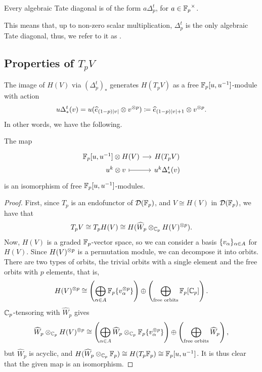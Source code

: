 \begin{corollary}
	Every algebraic Tate diagonal is of the form \(a\Delta^t_p\), for \(a \in {\mathbb{F}_p}^\times\).
\end{corollary}

This means that, up to non-zero scalar multiplication, \(\Delta^t_p\) is the only algebraic Tate diagonal, thus, we refer to it as .


\subsection{Properties of \(T_pV\)}

The image of \(H(V)\) via \((\Delta^t_p)_*\) generates \(H(T_pV)\) as a free \({\mathbb{F}_p}[u,u^{-1}]\)-module with action
\[
u \Delta^t_*(v) = u(\widehat e_{(1-p)|v|} \otimes v^{\otimes p}) \coloneqq \widehat e_{(1-p)|v|+1} \otimes v^{\otimes p}.
\]
In other words, we have the following.

\begin{lemma}\label{pTate_iso}
	The map
	\[
	\begin{tikzcd}[row sep=0, column sep=small]
		\Fp[u,u^{-1}] \ot H(V) \arrow[r] & H(T_pV) \\
		\hspace*{13pt} u^k \ot v \arrow[r, |->] & u^k \Delta^t_*(v)
	\end{tikzcd}
	\]
	is an isomorphism of free \({\mathbb{F}_p}[u,u^{-1}]\)-modules.
\end{lemma}

\begin{proof}
	First, since \(T_p\) is an endofunctor of \(\mathcal{D}({\mathbb{F}_p})\), and \(V \cong H(V)\) in \(\mathcal{D}({\mathbb{F}_p})\), we have that
	\[
	T_pV \cong T_pH(V) \cong H(\widehat W_p \otimes_{\cyc_p} H(V)^{\otimes p}). %
	\]
	Now, \(H(V)\) is a graded \({\mathbb{F}_p}\)-vector space, so we can consider a basis \(\{v_\alpha\}_{\alpha \in A}\) for \(H(V)\).
	Since \(H(V)^{\otimes p}\) is a permutation module, we can decompose it into orbits.
	There are two types of orbits, the trivial orbits with a single element and the free orbits with \(p\) elements, that is,
	\[
	H(V)^{\otimes p} \cong \left(\bigoplus_{\alpha \in A} {\mathbb{F}_p}\{v_\alpha^{\otimes p}\}\right) \oplus \left(\bigoplus_{\text{free orbits}} {\mathbb{F}_p}[\mathbb{C}_p]\right).
	\]
	\(\mathbb{C}_p\)-tensoring with \(\widehat W_p\) gives
	\[
	\widehat W_p \otimes_{\mathbb{C}_p} H(V)^{\otimes p} \cong \left(\bigoplus_{\alpha \in A} \widehat W_p \otimes_{\mathbb{C}_p} {\mathbb{F}_p}\{v_\alpha^{\otimes p}\}\right) \oplus \left(\bigoplus_{\text{free orbits}} \widehat W_p\right),
	\]
	but \(\widehat W_p\) is acyclic, and \(H(\widehat W_p \otimes_{\mathbb{C}_p} {\mathbb{F}_p}) \cong H(T_p{\mathbb{F}_p}) \cong {\mathbb{F}_p}[u,u^{-1}]\).
	It is thus clear that the given map is an isomorphism.
\end{proof}

